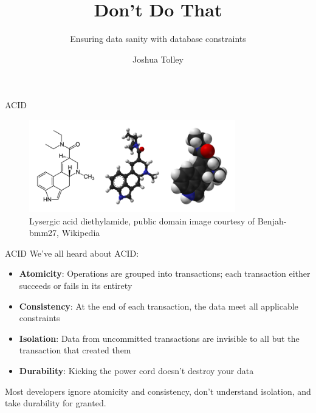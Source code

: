 \documentclass{beamer}
\begin{document}
\title{Don't Do That}
\subtitle{Ensuring data sanity with database constraints}
\author{Joshua Tolley}

\frame{\titlepage}


\begin{frame}{ACID}
    \begin{figure}[t]
        \includegraphics[width=0.8\textwidth]{lsd.png}
        \caption{Lysergic acid diethylamide, public domain image courtesy of Benjah-bmm27, Wikipedia}
    \end{figure}
\end{frame}

\begin{frame}{ACID}
    We've all heard about ACID:
    \begin{itemize}
        \item {\bf \color{red}Atomicity}: Operations are grouped into transactions; each transaction either succeeds or fails in its entirety
        \item {\bf \color{red}Consistency}: At the end of each transaction, the data meet all applicable constraints
        \item {\bf \color{red}Isolation}: Data from uncommitted transactions are invisible to all but the transaction that created them
        \item {\bf \color{red}Durability}: Kicking the power cord doesn't destroy your data
    \end{itemize}
    Most developers ignore atomicity and consistency, don't understand isolation, and take durability for granted.
\end{frame}
\end{document}
